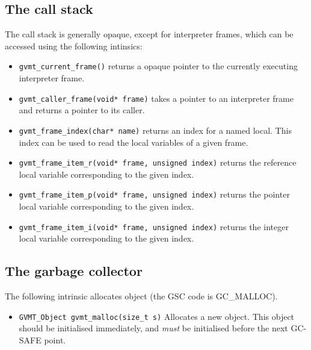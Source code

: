 \subsection{The call stack}
The call stack is generally opaque, except for interpreter frames, which can be accessed using the following intinsics:
\begin{itemize}
\item \verb|gvmt_current_frame()| returns a opaque pointer to the currently executing interpreter frame.
\item \verb|gvmt_caller_frame(void* frame)| takes a pointer to an interpreter frame and returns a pointer to its caller.
\item \verb|gvmt_frame_index(char* name)| returns an index for a named local. This index can be used to read the local variables of a given frame.
\item \verb|gvmt_frame_item_r(void* frame, unsigned index)| returns the reference local variable corresponding to the given index.
\item \verb|gvmt_frame_item_p(void* frame, unsigned index)| returns the pointer local variable corresponding to the given index.
\item \verb|gvmt_frame_item_i(void* frame, unsigned index)| returns the integer local variable corresponding to the given index.
\end{itemize}

\subsection{The garbage collector\label{sect:user-roots}}

The following intrinsic allocates object (the GSC code is GC\_MALLOC).
\begin{itemize}
\item \verb|GVMT_Object gvmt_malloc(size_t s)| Allocates a new object. This object should be initialised immediately, and \emph{must} be initialised before the next GC-SAFE point.
\end{itemize}

